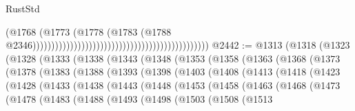\begin{lexlean}{RustStd}
\begin{coremodule}
                                                                                        (@1768
                                                                                          (@1773
                                                                                            (@1778
                                                                                              (@1783
                                                                                                (@1788
                                                                                                  @2346)))))))))))))))))))))))))))))))))))))))))))))))
@2442 := @1313
    (@1318
      (@1323
        (@1328
          (@1333
            (@1338
              (@1343
                (@1348
                  (@1353
                    (@1358
                      (@1363
                        (@1368
                          (@1373
                            (@1378
                              (@1383
                                (@1388
                                  (@1393
                                    (@1398
                                      (@1403
                                        (@1408
                                          (@1413
                                            (@1418
                                              (@1423
                                                (@1428
                                                  (@1433
                                                    (@1438
                                                      (@1443
                                                        (@1448
                                                          (@1453
                                                            (@1458
                                                              (@1463
                                                                (@1468
                                                                  (@1473
                                                                    (@1478
                                                                      (@1483
                                                                        (@1488
                                                                          (@1493
                                                                            (@1498
                                                                              (@1503
                                                                                (@1508
                                                                                  (@1513

\end{coremodule}
\end{lexlean}
